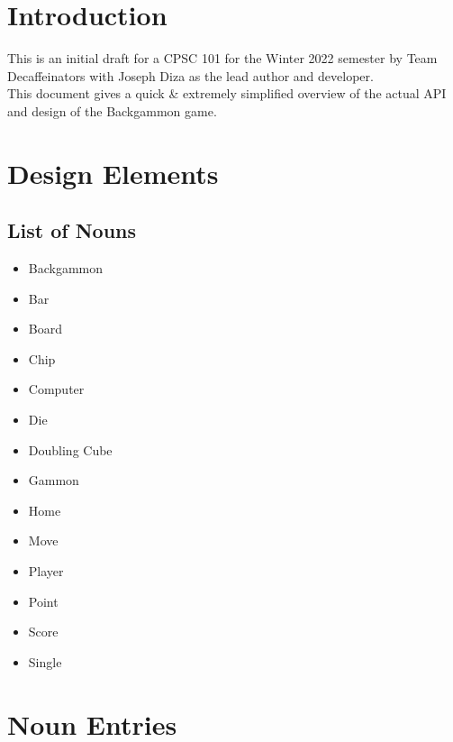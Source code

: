 \documentclass{report}
\begin{document}

\tableofcontents

\chapter{Introduction}

This is an initial draft for a CPSC 101 for the Winter 2022 semester by Team Decaffeinators
with Joseph Diza as the lead author and developer.  \\

\noindent
This document gives a quick \& extremely simplified overview
of the actual API and design of the Backgammon game.

\chapter{Design Elements}

\section{List of Nouns}

\begin{multicols}{2}
    \begin{itemize}
        \item Backgammon
        \item Bar
        \item Board
        \item Chip
        \item Computer
        \item Die
        \item Doubling Cube
    \end{itemize}

    \begin{itemize}
        \item Gammon
        \item Home
        \item Move
        \item Player
        \item Point
        \item Score
        \item Single
    \end{itemize}
\end{multicols}

\chapter{Noun Entries}
\end{document}

